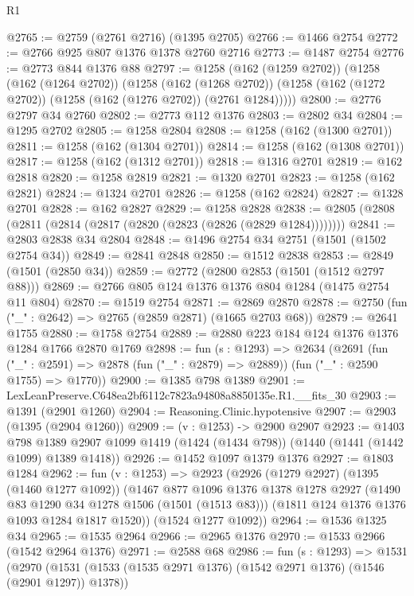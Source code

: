 \begin{lexlean}{R1}
\begin{coremodule}
@2765 := @2759 (@2761 @2716) (@1395 @2705)
@2766 := @1466 @2754
@2772 := @2766 @925 @807 @1376 @1378 @2760 @2716
@2773 := @1487 @2754
@2776 := @2773 @844 @1376 @88
@2797 := @1258
    (@162 (@1259 @2702))
    (@1258
      (@162 (@1264 @2702))
      (@1258
        (@162 (@1268 @2702))
        (@1258 (@162 (@1272 @2702)) (@1258 (@162 (@1276 @2702)) (@2761 @1284)))))
@2800 := @2776 @2797 @34 @2760
@2802 := @2773 @112 @1376
@2803 := @2802 @34
@2804 := @1295 @2702
@2805 := @1258 @2804
@2808 := @1258 (@162 (@1300 @2701))
@2811 := @1258 (@162 (@1304 @2701))
@2814 := @1258 (@162 (@1308 @2701))
@2817 := @1258 (@162 (@1312 @2701))
@2818 := @1316 @2701
@2819 := @162 @2818
@2820 := @1258 @2819
@2821 := @1320 @2701
@2823 := @1258 (@162 @2821)
@2824 := @1324 @2701
@2826 := @1258 (@162 @2824)
@2827 := @1328 @2701
@2828 := @162 @2827
@2829 := @1258 @2828
@2838 := @2805 (@2808 (@2811 (@2814 (@2817 (@2820 (@2823 (@2826 (@2829 @1284))))))))
@2841 := @2803 @2838 @34 @2804
@2848 := @1496 @2754 @34 @2751 (@1501 (@1502 @2754 @34))
@2849 := @2841 @2848
@2850 := @1512 @2838
@2853 := @2849 (@1501 (@2850 @34))
@2859 := @2772 (@2800 @2853 (@1501 (@1512 @2797 @88)))
@2869 := @2766 @805 @124 @1376 @1376 @804 @1284 (@1475 @2754 @11 @804)
@2870 := @1519 @2754
@2871 := @2869 @2870
@2878 := @2750 (fun ("_" : @2642) => @2765 (@2859 @2871) (@1665 @2703 @68))
@2879 := @2641 @1755
@2880 := @1758 @2754
@2889 := @2880 @223 @184 @124 @1376 @1376 @1284 @1766 @2870 @1769
@2898 := fun (s : @1293) =>
  @2634
    (@2691
      (fun ("_" : @2591) => @2878 (fun ("_" : @2879) => @2889))
      (fun ("_" : @2590 @1755) => @1770))
@2900 := @1385 @798 @1389
@2901 := LexLeanPreserve.C648ea2bf6112c7823a94808a8850135e.R1.__fits_30
@2903 := @1391 (@2901 @1260)
@2904 := Reasoning.Clinic.hypotensive
@2907 := @2903 (@1395 (@2904 @1260))
@2909 := (v : @1253) -> @2900 @2907
@2923 := @1403
    @798
    @1389
    @2907
    @1099
    @1419
    (@1424 (@1434 @798))
    (@1440 (@1441 (@1442 @1099) @1389 @1418))
@2926 := @1452 @1097 @1379 @1376
@2927 := @1803 @1284
@2962 := fun (v : @1253) =>
  @2923
    (@2926
      (@1279 @2927)
      (@1395 (@1460 @1277 @1092))
      (@1467
        @877
        @1096
        @1376
        @1378
        @1278
        @2927
        (@1490 @83 @1290 @34 @1278 @1506 (@1501 (@1513 @83)))
        (@1811 @124 @1376 @1376 @1093 @1284 @1817 @1520))
      (@1524 @1277 @1092))
@2964 := @1536 @1325 @34
@2965 := @1535 @2964
@2966 := @2965 @1376
@2970 := @1533 @2966 (@1542 @2964 @1376)
@2971 := @2588 @68
@2986 := fun (s : @1293) =>
  @1531
    (@2970
      (@1531 (@1533 (@1535 @2971 @1376) (@1542 @2971 @1376) (@1546 (@2901 @1297)) @1378))

\end{coremodule}
\end{lexlean}
